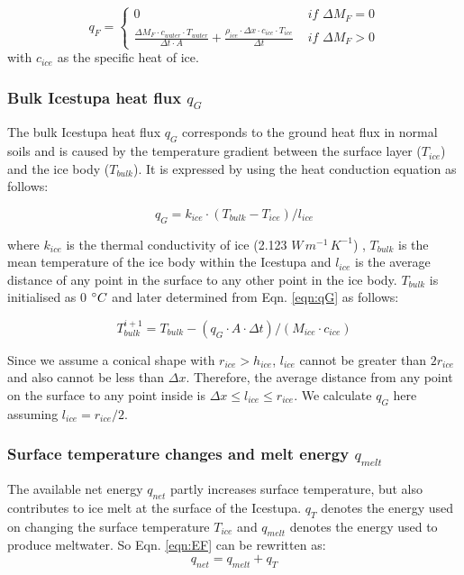 \documentclass[utf8]{frontiersSCNS} %
\begin{document}
\begin{equation} 
  q_{F} = \left\{ \begin{array}{ll}
         0 & \textit{ if } \Delta M_{F} = 0\\ \frac{ \Delta M_F \cdot c_{water} \cdot T_{water}}{\Delta t \cdot A} +
         \frac{\rho_{ice} \cdot \Delta x \cdot c_{ice} \cdot T_{ice}}{\Delta t} & \textit{ if } \Delta M_{F} > 0 
    \end{array} \right.  \label{eqn:qF}
\end{equation} 
with $c_{ice}$ as the specific heat of ice. 

\subsubsection{Bulk Icestupa heat flux \texorpdfstring{$q_{G}$}{Lg}} \label{sec:Bulkflux}
The bulk Icestupa heat flux $q_{G}$ corresponds to the ground heat flux in normal soils and is caused by the
temperature gradient between the surface layer ($T_{ice}$) and the ice body ($T_{bulk}$). It is expressed by using the
heat conduction equation as follows:

\begin{equation} q_{G} = k_{ice} \cdot (T_{bulk}-T_{ice})/l_{ice} \label{eqn:qG}    \end{equation}

where $k_{ice}$ is the thermal conductivity of ice (2.123 $W\, m^{-1}\,K^{-1}$) , $T_{bulk}$ is the mean temperature of
the ice body within the Icestupa and $l_{ice}$ is the average distance of any point in the surface to any other point
in the ice body. $T_{bulk}$ is initialised as 0 $\degree C$ and later determined from Eqn. \ref{eqn:qG} as follows:

\begin{equation} T_{bulk}^{i+1} = T_{bulk} - (q_{G} \cdot A \cdot \Delta t)/(M_{ice} \cdot c_{ice}) \end{equation}

Since we assume a conical shape with $r_{ice} > h_{ice}$, $l_{ice}$ cannot be greater than $2r_{ice}$ and also cannot
be less than $\Delta x$. Therefore, the average distance from any point on the surface to any point inside is $\Delta
x \leq l_{ice} \leq r_{ice}$. We calculate $q_{G}$ here assuming $l_{ice} = r_{ice}/2$.


\subsubsection{Surface temperature changes and melt energy \texorpdfstring{$q_{melt}$}{Lg}}
The available net energy $q_{net}$ partly increases surface temperature, but also contributes to ice melt at the
surface of the Icestupa. $q_{T}$ denotes the energy used on changing the surface temperature $T_{ice}$ and $q_{melt}$
denotes the energy used to produce meltwater. So Eqn. \ref{eqn:EF} can be rewritten as: \begin{equation} q_{net} =
q_{melt} + q_{T} \end{equation}
\end{document}
